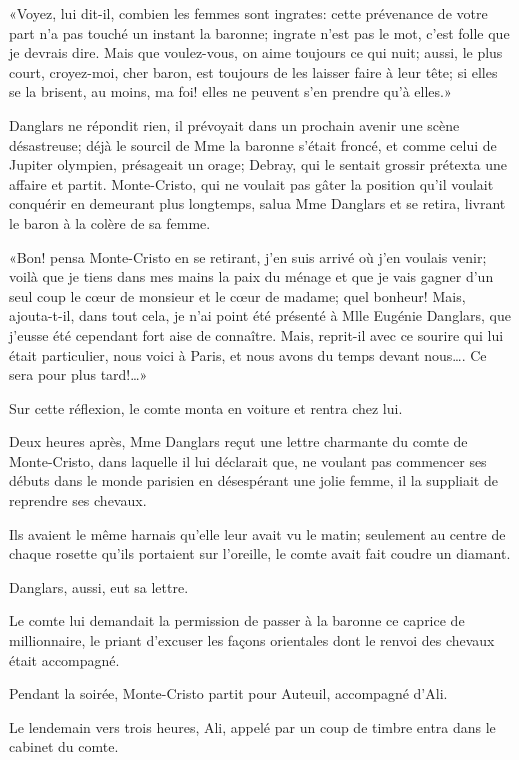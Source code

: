 «Voyez, lui dit-il, combien les femmes sont ingrates: cette prévenance de votre part n'a pas touché un instant la baronne; ingrate n'est pas le mot, c'est folle que je devrais dire. Mais que voulez-vous, on aime toujours ce qui nuit; aussi, le plus court, croyez-moi, cher baron, est toujours de les laisser faire à leur tête; si elles se la brisent, au moins, ma foi! elles ne peuvent s'en prendre qu'à elles.»  

Danglars ne répondit rien, il prévoyait dans un prochain avenir une scène désastreuse; déjà le sourcil de Mme la baronne s'était froncé, et comme celui de Jupiter olympien, présageait un orage; Debray, qui le sentait grossir prétexta une affaire et partit. Monte-Cristo, qui ne voulait pas gâter la position qu'il voulait conquérir en demeurant plus longtemps, salua Mme Danglars et se retira, livrant le baron à la colère de sa femme. 

«Bon! pensa Monte-Cristo en se retirant, j'en suis arrivé où j'en voulais venir; voilà que je tiens dans mes mains la paix du ménage et que je vais gagner d'un seul coup le cœur de monsieur et le cœur de madame; quel bonheur! Mais, ajouta-t-il, dans tout cela, je n'ai point été présenté à Mlle Eugénie Danglars, que j'eusse été cependant fort aise de connaître. Mais, reprit-il avec ce sourire qui lui était particulier, nous voici à Paris, et nous avons du temps devant nous\dots. Ce sera pour plus tard!\dots» 

Sur cette réflexion, le comte monta en voiture et rentra chez lui. 

Deux heures après, Mme Danglars reçut une lettre charmante du comte de Monte-Cristo, dans laquelle il lui déclarait que, ne voulant pas commencer ses débuts dans le monde parisien en désespérant une jolie femme, il la suppliait de reprendre ses chevaux. 

Ils avaient le même harnais qu'elle leur avait vu le matin; seulement au centre de chaque rosette qu'ils portaient sur l'oreille, le comte avait fait coudre un diamant.  

Danglars, aussi, eut sa lettre. 

Le comte lui demandait la permission de passer à la baronne ce caprice de millionnaire, le priant d'excuser les façons orientales dont le renvoi des chevaux était accompagné. 

Pendant la soirée, Monte-Cristo partit pour Auteuil, accompagné d'Ali. 

Le lendemain vers trois heures, Ali, appelé par un coup de timbre entra dans le cabinet du comte. 


